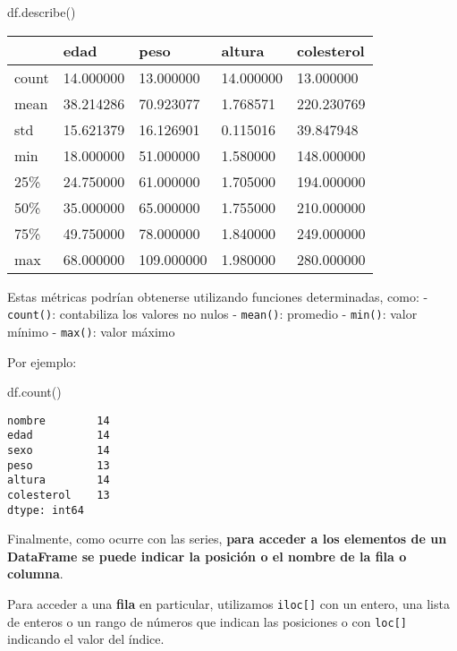 \documentclass[
  letterpaper,
  DIV=11,
  numbers=noendperiod]{scrreprt}
\newenvironment{Shaded}{\begin{snugshade}}{\end{snugshade}}
\newcommand{\NormalTok}[1]{\textcolor[rgb]{0.00,0.23,0.31}{#1}}
\begin{document}
\begin{Shaded}
\begin{Highlighting}[]
\NormalTok{df.describe()}
\end{Highlighting}
\end{Shaded}

\begin{longtable}[]{@{}lllll@{}}
\toprule\noalign{}
& edad & peso & altura & colesterol \\
\midrule\noalign{}
\endhead
\bottomrule\noalign{}
\endlastfoot
count & 14.000000 & 13.000000 & 14.000000 & 13.000000 \\
mean & 38.214286 & 70.923077 & 1.768571 & 220.230769 \\
std & 15.621379 & 16.126901 & 0.115016 & 39.847948 \\
min & 18.000000 & 51.000000 & 1.580000 & 148.000000 \\
25\% & 24.750000 & 61.000000 & 1.705000 & 194.000000 \\
50\% & 35.000000 & 65.000000 & 1.755000 & 210.000000 \\
75\% & 49.750000 & 78.000000 & 1.840000 & 249.000000 \\
max & 68.000000 & 109.000000 & 1.980000 & 280.000000 \\
\end{longtable}

Estas métricas podrían obtenerse utilizando funciones determinadas,
como: - \texttt{count()}: contabiliza los valores no nulos -
\texttt{mean()}: promedio - \texttt{min()}: valor mínimo -
\texttt{max()}: valor máximo

Por ejemplo:

\begin{Shaded}
\begin{Highlighting}[]
\NormalTok{df.count()}
\end{Highlighting}
\end{Shaded}

\begin{verbatim}
nombre        14
edad          14
sexo          14
peso          13
altura        14
colesterol    13
dtype: int64
\end{verbatim}

Finalmente, como ocurre con las series, \textbf{para acceder a los
elementos de un DataFrame se puede indicar la posición o el nombre de la
fila o columna}.

Para acceder a una \textbf{fila} en particular, utilizamos
\texttt{iloc{[}{]}} con un entero, una lista de enteros o un rango de
números que indican las posiciones o con \texttt{loc{[}{]}} indicando el
valor del índice.
\end{document}
